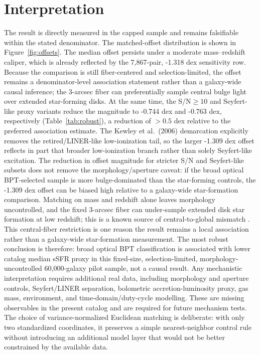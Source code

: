 \documentclass[twocolumn]{aastex631}
\begin{document}
\section{Interpretation}
The result is directly measured in the capped sample and remains falsifiable within the stated denominator. The matched-offset distribution is shown in Figure~\ref{fig:offsets}. The median offset persists under a moderate mass--redshift caliper, which is already reflected by the 7,867-pair, -1.318 dex sensitivity row. Because the comparison is still fiber-centered and selection-limited, the offset remains a denominator-level association statement rather than a galaxy-wide causal inference; the 3-arcsec fiber can preferentially sample central bulge light over extended star-forming disks. At the same time, the S/N$\geq10$ and Seyfert-like proxy variants reduce the magnitude to -0.744 dex and -0.763 dex, respectively (Table~\ref{tab:robust}), a reduction of $>0.5$ dex relative to the preferred association estimate. The Kewley et al.\ (2006) demarcation explicitly removes the retired/LINER-like low-ionization tail, so the larger -1.309 dex offset reflects in part that broader low-ionization branch rather than solely Seyfert-like excitation. The reduction in offset magnitude for stricter S/N and Seyfert-like subsets does not remove the morphology/aperture caveat: if the broad optical BPT-selected sample is more bulge-dominated than the star-forming controls, the -1.309 dex offset can be biased high relative to a galaxy-wide star-formation comparison. Matching on mass and redshift alone leaves morphology uncontrolled, and the fixed 3-arcsec fiber can under-sample extended disk star formation at low redshift; this is a known source of central-to-global mismatch \citep[e.g.,][]{harrison2017,ellison2021}. This central-fiber restriction is one reason the result remains a local association rather than a galaxy-wide star-formation measurement. The most robust conclusion is therefore: broad optical BPT classification is associated with lower catalog median sSFR proxy in this fixed-size, selection-limited, morphology-uncontrolled 60,000-galaxy pilot sample, not a causal result. Any mechanistic interpretation requires additional real data, including morphology and aperture controls, Seyfert/LINER separation, bolometric accretion-luminosity proxy, gas mass, environment, and time-domain/duty-cycle modelling. These are missing observables in the present catalog and are required for future mechanism tests.
The choice of variance-normalized Euclidean matching is deliberate: with only two standardized coordinates, it preserves a simple nearest-neighbor control rule without introducing an additional model layer that would not be better constrained by the available data.
\end{document}
